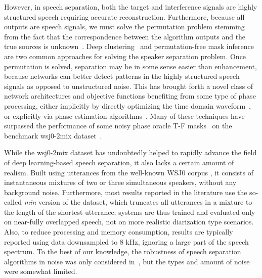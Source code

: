 \documentclass[a4paper]{article}
\begin{document}
However, in speech separation, both the target and interference signals are highly structured speech requiring accurate reconstruction.  Furthermore, because all outputs are speech signals, we must solve the permutation problem stemming from the fact that the correspondence between the algorithm outputs and the true sources is unknown~\cite{Hershey2016}.  Deep clustering~\cite{Hershey2016, Isik2016, Wang2018ICASSP04Alternative} and permutation-free mask inference~\cite{Hershey2016, Kolbaek2017} are two common approaches for solving the speaker separation problem.  Once permutation is solved, separation may be in some sense easier than enhancement, because networks can better detect patterns in the highly structured speech signals as opposed to unstructured noise.  This has brought forth a novel class of network architectures and objective functions benefiting from some type of phase processing, either implicitly by directly optimizing the time domain waveform~\cite{Wang2018Interspeech09, Luo2018TasNet09arXiv, shi2019furcanext}, or explicitly via phase estimation algorithms~\cite{Wang2018Interspeech09, leroux2019phasebook, wang2018deep}.  Many of these techniques have surpassed the performance of some noisy phase oracle T-F masks~\cite{Luo2018TasNet09arXiv, wang2018deep, shi2019furcanext, Wichern2018IWAENC09} on the benchmark wsj0-2mix dataset~\cite{Hershey2016}.

While the wsj0-2mix dataset has undoubtedly helped to rapidly advance the field of deep learning-based speech separation, it also lacks a certain amount of realism.  Built using utterances from the well-known WSJ0 corpus \cite{garofolo1993csr}, it consists of instantaneous mixtures of two or three simultaneous speakers, without any background noise.  Furthermore, most results reported in the literature use the so-called \emph{min} version of the dataset, which truncates all utterances in a mixture to the length of the shortest utterance; systems are thus trained and evaluated only on near-fully overlapped speech, not on more realistic diarization type scenarios.  Also, to reduce processing and memory consumption, results are typically reported using data downsampled to 8 kHz, ignoring a large part of the speech spectrum. To the best of our knowledge, the robustness of speech separation algorithms in noise was only considered in~\cite{kolbaek2017joint, drude2019integration}, but the types and amount of noise
were somewhat limited. 
\end{document}
